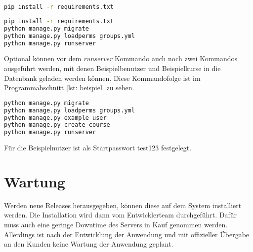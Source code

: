 \begin{lstlisting}[language = bash, caption = Pythonpakete installieren, label = lst: pakete]
pip install -r requirements.txt
\end{lstlisting}

\begin{lstlisting}[language = bash, caption = Kommandozeilenanweisungen zum Starten des Servers, label = lst: komandos]
pip install -r requirements.txt
python manage.py migrate
python manage.py loadperms groups.yml
python manage.py runserver
\end{lstlisting}

Optional können vor dem \textit{runserver} Kommando auch noch zwei Kommandos ausgeführt werden, mit denen Beispielbenutzer und Beispielkurse in die Datenbank geladen werden können. Diese Kommandofolge ist im Programmabschnitt \ref{lst: beispiel} zu sehen.

\begin{lstlisting}[language = bash, caption = Kommandozeilenanweisungen zum Starten des Servers, label = lst: beispiel]
python manage.py migrate
python manage.py loadperms groups.yml
python manage.py example_user
python manage.py create_course
python manage.py runserver
\end{lstlisting}

Für die Beispielnutzer ist als Startpasswort \glqq test123\grqq\; festgelegt.

\section{Wartung}
Werden neue Releases herausgegeben, können diese auf dem System installiert werden. Die Installation wird dann vom Entwicklerteam durchgeführt. Dafür muss auch eine geringe Downtime des Servers in Kauf genommen werden. 
Allerdings ist nach der Entwicklung der Anwendung und mit offizieller Übergabe an den Kunden keine Wartung der Anwendung geplant.
